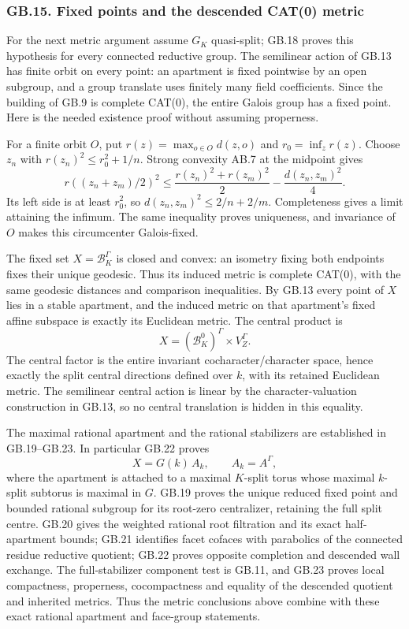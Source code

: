 \documentclass[
  11pt,
]{article}
\begin{document}
\subsubsection{GB.15. Fixed points and the descended CAT(0)
metric}\label{gb.15.-fixed-points-and-the-descended-cat0-metric}

For the next metric argument assume \(G_K\) quasi-split; GB.18 proves
this hypothesis for every connected reductive group. The semilinear
action of GB.13 has finite orbit on every point: an apartment is fixed
pointwise by an open subgroup, and a group translate uses finitely many
field coefficients. Since the building of GB.9 is complete CAT(0), the
entire Galois group has a fixed point. Here is the needed existence
proof without assuming properness.

For a finite orbit \(O\), put \(r(z)=\max_{o\in O}d(z,o)\) and
\(r_0=\inf_zr(z)\). Choose \(z_n\) with \(r(z_n)^2\leq r_0^2+1/n\).
Strong convexity AB.7 at the midpoint gives \[
 r((z_n+z_m)/2)^2
 \leq\frac{r(z_n)^2+r(z_m)^2}{2}
                 -\frac{d(z_n,z_m)^2}{4}.
 \tag{GB.45}
\] Its left side is at least \(r_0^2\), so \(d(z_n,z_m)^2\leq2/n+2/m\).
Completeness gives a limit attaining the infimum. The same inequality
proves uniqueness, and invariance of \(O\) makes this circumcenter
Galois-fixed.

The fixed set \(X=\mathcal B_K^\Gamma\) is closed and convex: an
isometry fixing both endpoints fixes their unique geodesic. Thus its
induced metric is complete CAT(0), with the same geodesic distances and
comparison inequalities. By GB.13 every point of \(X\) lies in a stable
apartment, and the induced metric on that apartment's fixed affine
subspace is exactly its Euclidean metric. The central product is \[
 X=(\mathcal B_K^0)^\Gamma\times V_Z^\Gamma.
 \tag{GB.46}
\] The central factor is the entire invariant cocharacter/character
space, hence exactly the split central directions defined over \(k\),
with its retained Euclidean metric. The semilinear central action is
linear by the character-valuation construction in GB.13, so no central
translation is hidden in this equality.

The maximal rational apartment and the rational stabilizers are
established in GB.19--GB.23. In particular GB.22 proves \[
 X=G(k)\,A_k,\qquad A_k=A^\Gamma,
 \tag{GB.47}
\] where the apartment is attached to a maximal \(K\)-split torus whose
maximal \(k\)-split subtorus is maximal in \(G\). GB.19 proves the
unique reduced fixed point and bounded rational subgroup for its
root-zero centralizer, retaining the full split centre. GB.20 gives the
weighted rational root filtration and its exact half-apartment bounds;
GB.21 identifies facet cofaces with parabolics of the connected residue
reductive quotient; GB.22 proves opposite completion and descended wall
exchange. The full-stabilizer component test is GB.11, and GB.23 proves
local compactness, properness, cocompactness and equality of the
descended quotient and inherited metrics. Thus the metric conclusions
above combine with these exact rational apartment and face-group
statements.
\end{document}
